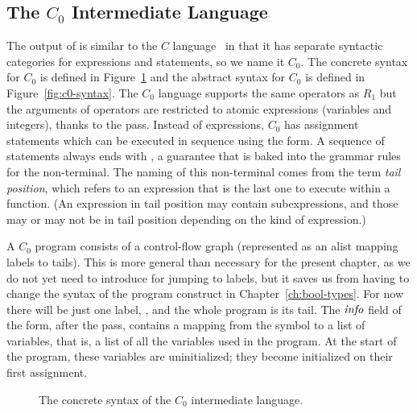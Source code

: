 \documentclass[11pt]{book}
\begin{document}
\subsection{The $C_0$ Intermediate Language}

The output of  is similar to the $C$
language~\citep{Kernighan:1988nx} in that it has separate syntactic
categories for expressions and statements, so we name it $C_0$.  The
concrete syntax for $C_0$ is defined in
Figure~\ref{fig:c0-concrete-syntax} and the abstract syntax for $C_0$
is defined in Figure~\ref{fig:c0-syntax}.
%
The $C_0$ language supports the same operators as $R_1$ but the
arguments of operators are restricted to atomic expressions (variables
and integers), thanks to the  pass. Instead
of  expressions, $C_0$ has assignment statements which can be
executed in sequence using the  form. A sequence of
statements always ends with , a guarantee that is baked
into the grammar rules for the  non-terminal. The naming of
this non-terminal comes from the term \emph{tail position},
which refers to an expression that is the last one to execute within a
function. (An expression in tail position may contain subexpressions,
and those may or may not be in tail position depending on the kind of
expression.)

A $C_0$ program consists of a control-flow graph (represented as an
alist mapping labels to tails). This is more general than
necessary for the present chapter, as we do not yet need to introduce
 for jumping to labels, but it saves us from having to
change the syntax of the program construct in
Chapter~\ref{ch:bool-types}.  For now there will be just one label,
, and the whole program is its tail.
%
The $\mathit{info}$ field of the  form, after the
 pass, contains a mapping from the symbol
 to a list of variables, that is, a list of all the
variables used in the program. At the start of the program, these
variables are uninitialized; they become initialized on their first
assignment.

\begin{figure}[tbp]
\caption{The concrete syntax of the $C_0$ intermediate language.}
\label{fig:c0-concrete-syntax}
\end{figure}
\end{document}
